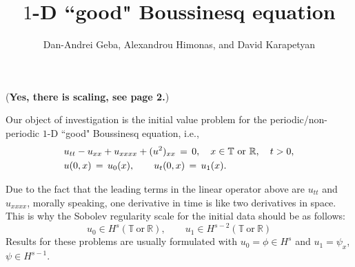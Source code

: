 \documentclass[12pt,reqno]{amsart}
\numberwithin{equation}{section}  %
\numberwithin{figure}{section}
\begin{document}
\title{$1$-D ``good" Boussinesq equation}

\author{Dan-Andrei Geba, Alexandrou Himonas, and David Karapetyan}

\address{Department of Mathematics, University of Rochester, Rochester, NY 14627}
\address{Department of Mathematics, University of Notre Dame, Notre Dame, IN 46556}
\address{Department of Mathematics, University of Notre Dame, Notre Dame, IN 46556}
\date{}



\maketitle

({\bf  Yes, there is scaling, see page 2.})

Our object of investigation is the initial value problem for the periodic/non-periodic $1$-D ``good" Boussinesq equation, i.e.,
\begin{equation}
  \aligned
  &u_{tt}-u_{xx}+u_{xxxx}+(u^2)_{xx}\,=\,0, \quad x\in \mathbb{T}\ \text{or} \ \mathbb{R}, \quad t>0,\\
&u(0,x)\,=\,u_0(x),\qquad u_t(0,x)\,=\,u_1(x).\endaligned
\label{main}
\end{equation}

Due to the fact that the leading terms in the linear operator above are $u_{tt}$ and $u_{xxxx}$, morally speaking, one derivative in time is like two derivatives in space. This is why the Sobolev regularity scale for the initial data should be as follows:
\[
u_0\in H^s(\mathbb{T}\ \text{or} \ \mathbb{R}), \qquad u_1\in H^{s-2}(\mathbb{T}\ \text{or} \ \mathbb{R})
\]
Results for these problems are usually formulated with $u_0=\phi \in H^s$ and $u_1=\psi_x$, $\psi\in H^{s-1}$.
\end{document}
